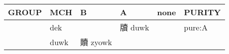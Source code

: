 \documentclass[14pt,a4paper]{scrartcl}
\begin{document}
\begin{longtable}[c]{@{}llllll@{}}
\toprule
\begin{minipage}[b]{0.14\columnwidth}\raggedright\strut
GROUP
\strut\end{minipage} &
\begin{minipage}[b]{0.14\columnwidth}\raggedright\strut
MCH
\strut\end{minipage} &
\begin{minipage}[b]{0.14\columnwidth}\raggedright\strut
B
\strut\end{minipage} &
\begin{minipage}[b]{0.14\columnwidth}\raggedright\strut
A
\strut\end{minipage} &
\begin{minipage}[b]{0.14\columnwidth}\raggedright\strut
none
\strut\end{minipage} &
\begin{minipage}[b]{0.14\columnwidth}\raggedright\strut
PURITY
\strut\end{minipage}\tabularnewline
\midrule
\endhead
\begin{minipage}[t]{0.14\columnwidth}\raggedright\strut
𧷗
\strut\end{minipage} &
\begin{minipage}[t]{0.14\columnwidth}\raggedright\strut
dek
\strut\end{minipage} &
\begin{minipage}[t]{0.14\columnwidth}\raggedright\strut
\strut\end{minipage} &
\begin{minipage}[t]{0.14\columnwidth}\raggedright\strut
牘 duwk
\strut\end{minipage} &
\begin{minipage}[t]{0.14\columnwidth}\raggedright\strut
\strut\end{minipage} &
\begin{minipage}[t]{0.14\columnwidth}\raggedright\strut
pure:A
\strut\end{minipage}\tabularnewline
\begin{minipage}[t]{0.14\columnwidth}\raggedright\strut
𧸇
\strut\end{minipage} &
\begin{minipage}[t]{0.14\columnwidth}\raggedright\strut
duwk
\strut\end{minipage} &
\begin{minipage}[t]{0.14\columnwidth}\raggedright\strut
贖 zyowk
\strut\end{minipage} &
\begin{minipage}[t]{0.14\columnwidth}\raggedright\strut

\end{minipage}
\end{longtable}
\end{document}
